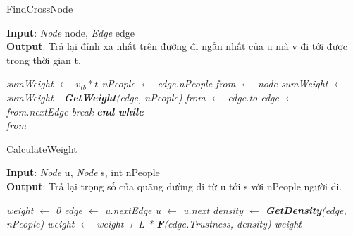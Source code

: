     \begin{algorithm}
        \caption{FindCrossNode}
        \textbf{Input}: \textit{Node} node, \textit{Edge} edge\\
        \textbf{Output}: Trả lại đỉnh xa nhất trên đường đi ngắn nhất của u mà v 
        đi tới được trong thời gian t.
        \begin{algorithmic}
            \em
            \State sumWeight $\gets$ $v_{tb}*t$ 
            \State nPeople $\gets$ edge.nPeople
            \State from $\gets$ node
            \State sumWeight $\gets$ sumWeight - \textbf{GetWeight}(edge, nPeople)
            \State from $\gets$ edge.to
            \State edge $\gets$ from.nextEdge
             break
            \EndIf
            \EndWhile 
            \textbf{end while} \\
            \Return from
            \EndProcedure
        \end{algorithmic}
    \end{algorithm}

    \begin{algorithm}
        \caption{CalculateWeight}
        \textbf{Input}: \textit{Node} u, \textit{Node} s, int nPeople \\
        \textbf{Output}: Trả lại trọng số của quãng đường đi từ u tới s với 
        nPeople người đi.
        \begin{algorithmic}
            \em
            \State weight $\gets$ 0
            \State edge $\gets$ u.nextEdge
            \State u $\gets$ u.next
            \State density $\gets$ \textbf{GetDensity}(edge, nPeople)
            \State weight $\gets$ weight + L * \textbf{F}(edge.Trustness, density)
            \EndWhile
            \Return weight
            \EndProcedure
        \end{algorithmic}
    \end{algorithm}

